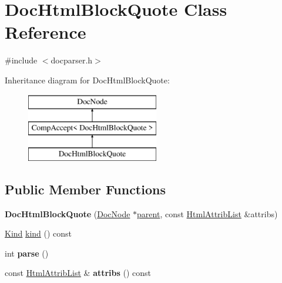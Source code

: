 \hypertarget{class_doc_html_block_quote}{}\section{Doc\+Html\+Block\+Quote Class Reference}
\label{class_doc_html_block_quote}


{\ttfamily \#include $<$docparser.\+h$>$}

Inheritance diagram for Doc\+Html\+Block\+Quote\+:\begin{figure}[H]
\begin{center}
\leavevmode
\includegraphics[height=3.000000cm]{class_doc_html_block_quote}
\end{center}
\end{figure}
\subsection*{Public Member Functions}
\begin{DoxyCompactItemize}
\item 
\mbox{\label{class_doc_html_block_quote_a2c8b133bd1fed4e62d4cf90bb47ddb69}} 
{\bfseries Doc\+Html\+Block\+Quote} (\mbox{\hyperlink{class_doc_node}{Doc\+Node}} $\ast$\mbox{\hyperlink{class_doc_node_a73e8ad29a91cfceb0968eb00db71a23d}{parent}}, const \mbox{\hyperlink{class_html_attrib_list}{Html\+Attrib\+List}} \&attribs)
\item 
\mbox{\hyperlink{class_doc_node_aebd16e89ca590d84cbd40543ea5faadb}{Kind}} \mbox{\hyperlink{class_doc_html_block_quote_abed6e9fd631d3e7b7cf1b2330dc96677}{kind}} () const
\item 
\mbox{\label{class_doc_html_block_quote_ac79bcb818ae3fc4802360b4913e4d3df}} 
int {\bfseries parse} ()
\item 
\mbox{\label{class_doc_html_block_quote_af121e8b1038eba32d56ea4dd2952414c}} 
const \mbox{\hyperlink{class_html_attrib_list}{Html\+Attrib\+List}} \& {\bfseries attribs} () const
\end{DoxyCompactItemize}
